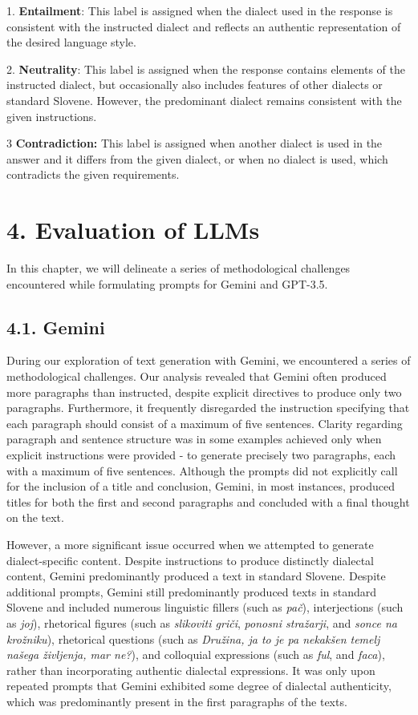 \documentclass[fleqn,moreauthors,10pt]{ds_report}
\begin{document}
1. \textbf{Entailment}: This label is assigned when the dialect used in the response is consistent with the instructed dialect and reflects an authentic representation of the desired language style.

2. \textbf{Neutrality}: This label is assigned when the response contains elements of the instructed dialect, but occasionally also includes features of other dialects or standard Slovene. However, the predominant dialect remains consistent with the given instructions.

3 \textbf{Contradiction:} This label is assigned when another dialect is used in the answer and it differs from the given dialect, or when no dialect is used, which contradicts the given requirements.



\section*{4. Evaluation of LLMs}

    In this chapter, we will delineate a series of methodological challenges encountered while formulating prompts for Gemini and GPT-3.5.

\subsection*{4.1. Gemini}

    During our exploration of text generation with Gemini, we encountered a series of methodological challenges. Our analysis revealed that Gemini often produced more paragraphs than instructed, despite explicit directives to produce only two paragraphs. Furthermore, it frequently disregarded the instruction specifying that each paragraph should consist of a maximum of five sentences. Clarity regarding paragraph and sentence structure was in some examples achieved only when explicit instructions were provided - to generate precisely two paragraphs, each with a maximum of five sentences. Although the prompts did not explicitly call for the inclusion of a title and conclusion, Gemini, in most instances, produced titles for both the first and second paragraphs and concluded with a final thought on the text. 

    However, a more significant issue occurred when we attempted to generate dialect-specific content. Despite instructions to produce distinctly dialectal content, Gemini predominantly produced a text in standard Slovene. Despite additional prompts, Gemini still predominantly produced texts in standard Slovene and included numerous linguistic fillers (such as \textit{pač}), interjections (such as \textit{joj}), rhetorical figures (such as \textit{slikoviti griči}, \textit{ponosni stražarji}, and \textit{sonce na krožniku}), rhetorical questions (such as \textit{Družina, ja to je pa nekakšen temelj našega življenja, mar ne?}), and colloquial expressions (such as \textit{ful}, and \textit{faca}), rather than incorporating authentic dialectal expressions. It was only upon repeated prompts that Gemini exhibited some degree of dialectal authenticity, which was predominantly present in the first paragraphs of the texts.  
\end{document}
